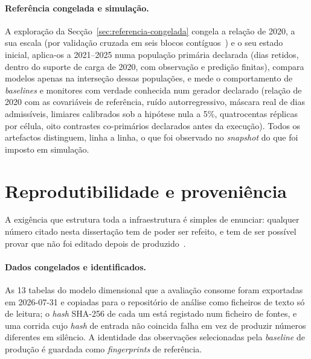 \paragraph{Referência congelada e simulação.} A exploração da
Secção~\ref{sec:referencia-congelada} congela a relação de 2020, a sua
escala (por validação cruzada em seis blocos contíguos~\cite{BergmeirHyndmanKoo2018})
e o seu estado
inicial, aplica-os a 2021--2025 numa população primária declarada (dias
retidos, dentro do suporte de carga de 2020, com observação e predição
finitas), compara modelos apenas na interseção dessas populações, e mede o
comportamento de \emph{baselines} e monitores com verdade conhecida num
gerador declarado (relação de 2020 com as covariáveis de referência, ruído
autorregressivo, máscara real de dias admissíveis, limiares calibrados sob
a hipótese nula a 5\%, quatrocentas réplicas por célula, oito contrastes
co-primários declarados antes da execução). Todos os artefactos
distinguem, linha a linha, o que foi observado no \emph{snapshot} do que
foi imposto em simulação.

\section{Reprodutibilidade e proveniência}
\label{sec:reprodutibilidade}

A exigência que estrutura toda a infraestrutura é simples de enunciar:
qualquer número citado nesta dissertação tem de poder ser refeito, e tem
de ser possível provar que não foi editado depois de
produzido~\cite{Peng2011,Sandve2013}.

\paragraph{Dados congelados e identificados.} As 13 tabelas do modelo
dimensional que a avaliação consome foram exportadas em 2026-07-31 e
copiadas para o repositório de análise como ficheiros de texto só de
leitura; o \emph{hash} SHA-256 de cada um está registado num ficheiro de
fontes, e uma corrida cujo \emph{hash} de entrada não coincida falha em vez
de produzir números diferentes em silêncio. A identidade das observações
selecionadas pela \emph{baseline} de produção é guardada como
\emph{fingerprints} de referência.

